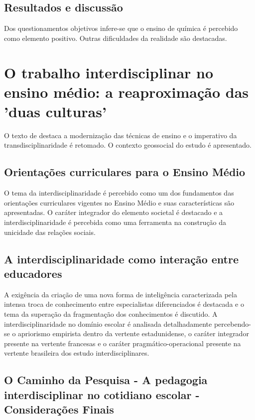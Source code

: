\documentclass[
   article,       %
   12pt,          %
   oneside,       %
   a4paper,       %
   english,       %
   brazil,           %
   sumario=tradicional
   ]{abntex2}
\begin{document}
\subsection{Resultados e discussão}

Dos questionamentos objetivos infere-se que o ensino de química é percebido como elemento positivo. Outras dificuldades da realidade são destacadas.








\newpage

\section{O trabalho interdisciplinar no ensino médio: a reaproximação das 'duas culturas'}


O texto de \cite{interdisciplinar_Duas_Culturas} destaca a modernização das técnicas de ensino e o imperativo da transdisciplinaridade é retomado. O contexto geossocial do estudo é apresentado.


\subsection{Orientações curriculares para o Ensino Médio}

O tema da interdisciplinaridade é percebido como um dos fundamentos das orientações curriculares vigentes no Ensino Médio e suas características são apresentadas. O caráter integrador do elemento societal é destacado e a interdisciplinaridade é percebida como uma ferramenta na construção da unicidade das relações sociais.


\subsection{A interdisciplinaridade como interação entre educadores}

A exigência da criação de uma nova forma de inteligência caracterizada pela intensa troca de conhecimento entre especialistas diferenciados é destacada e o tema da superação da fragmentação dos conhecimentos é discutido. A interdisciplinaridade no domínio escolar é analisada detalhadamente percebendo-se o apriorismo empirista dentro da vertente estadunidense, o caráter integrador presente na vertente francesas e o caráter pragmático-operacional presente na vertente brasileira dos estudo interdisciplinares.  


\subsection{O Caminho da Pesquisa - A pedagogia interdisciplinar no cotidiano escolar - Considerações Finais}
\end{document}

